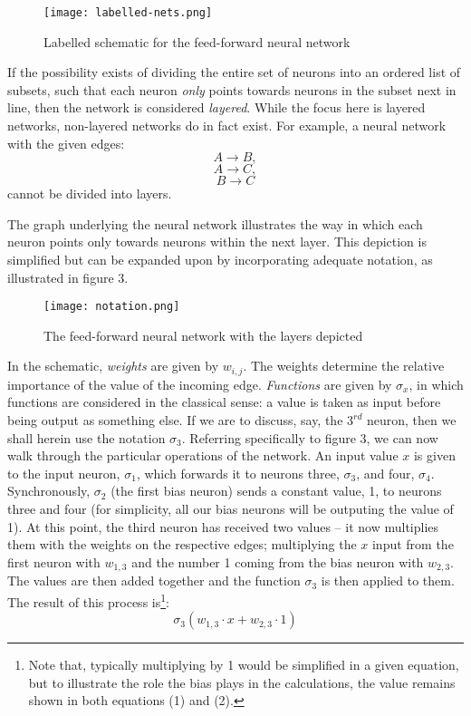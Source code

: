 \documentclass[11pt]{article}
\begin{document}
\begin{figure}[h]
    \centering
    \texttt{[image: labelled-nets.png]}
    \caption{Labelled schematic for the feed-forward neural network}   
\end{figure}

If the possibility exists of dividing the entire set of neurons into an ordered list of subsets, such that each neuron \textit{only} points towards neurons in the subset next in line, then the network is considered \textit{layered}. While the focus here is layered networks, non-layered networks do in fact exist. For example, a neural network with the given edges:
\begin{equation}A \rightarrow B, \nonumber\end{equation}
\begin{equation}A \rightarrow C, \nonumber\end{equation}
\begin{equation}B \rightarrow C \nonumber\end{equation}
cannot be divided into layers.

The graph underlying the neural network illustrates the way in which each neuron points only towards neurons within the next layer. This depiction is simplified but can be expanded upon by incorporating adequate notation, as illustrated in figure 3.

\begin{figure}[h]
    \centering
    \texttt{[image: notation.png]}
    \caption{The feed-forward neural network with the layers depicted}   
\end{figure}

In the schematic, \textit{weights} are given by $w_{i, j}$. The weights determine the relative importance of the value of the incoming edge. \textit{Functions} are given by $\sigma_{x}$, in which functions are considered in the classical sense: a value is taken as input before being output as something else. If we are to discuss, say, the $3^{rd}$ neuron, then we shall herein use the notation $\sigma_{3}$.
	Referring specifically to figure 3, we can now walk through the particular operations of the network. An input value $x$ is given to the input neuron, $\sigma_{1}$, which forwards it to neurons three, $\sigma_{3}$, and four, $\sigma_{4}$. Synchronously, $\sigma_{2}$ (the first bias neuron) sends a constant value, 1, to neurons three and four (for simplicity, all our bias neurons will be outputing the value of 1). At this point, the third neuron has received two values – it now multiplies them with the weights on the respective edges; multiplying the $x$ input from the first neuron with $w_{1, 3}$ and the number 1 coming from the bias neuron with $w_{2, 3}$. The values are then added together and the function $\sigma_{3}$ is then applied to them. The result of this process is\footnote{Note that, typically multiplying by 1 would be simplified in a given equation, but to illustrate the role the bias plays in the calculations, the value remains shown in both equations (1) and (2).}:
\begin{equation}\sigma_{3}(w_{1, 3}\cdot x + w_{2, 3}\cdot 1)\end{equation}
\end{document}
